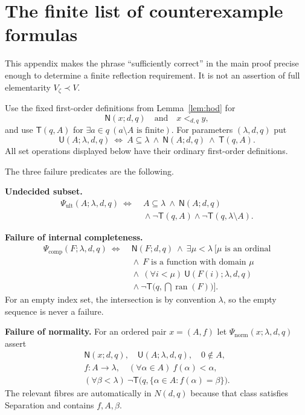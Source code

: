 \documentclass[11pt,letterpaper]{article}
\theoremstyle{definition}
\newcommand{\ran}{\operatorname{ran}}
\begin{document}
\appendix
\section{The finite list of counterexample formulas}\label{app:formulas}

This appendix makes the phrase ``sufficiently correct'' in the main proof precise enough to determine a finite reflection requirement. It is not an assertion of full elementarity $V_\zeta\prec V$.

Use the fixed first-order definitions from Lemma~\ref{lem:hod} for
\[
 \mathsf N(x;d,q)\quad\text{and}\quad x<_{d,q}y,
\]
and use $\mathsf T(q,A)$ for $\exists a\in q\ (a\setminus A\text{ is finite})$. For parameters $(\lambda,d,q)$ put
\[
 \mathsf U(A;\lambda,d,q)\ \Longleftrightarrow\
       A\subseteq\lambda\ \wedge\ \mathsf N(A;d,q)\ \wedge\ \mathsf T(q,A).
\]
All set operations displayed below have their ordinary first-order definitions.

The three failure predicates are the following.

\textbf{Undecided subset.}
\[
 \begin{split}
 \Psi_{\mathrm{ult}}(A;\lambda,d,q)\ \Longleftrightarrow\;&
 A\subseteq\lambda\ \wedge\ \mathsf N(A;d,q)\\
 &{}\wedge\neg\mathsf T(q,A)
       \wedge\neg\mathsf T(q,\lambda\setminus A).
 \end{split}
\]

\textbf{Failure of internal completeness.}
\[
 \begin{split}
 \Psi_{\mathrm{comp}}(F;\lambda,d,q)\ \Longleftrightarrow\;&
 \mathsf N(F;d,q)\ \wedge\
 \exists\mu<\lambda\ \bigl[\mu\text{ is an ordinal}\\
 &{}\wedge\ F\text{ is a function with domain }\mu\\
 &{}\wedge\ (\forall i<\mu)\ \mathsf U(F(i);\lambda,d,q)\\
 &{}\wedge\neg\mathsf T\bigl(q,\bigcap\ran(F)\bigr)\bigr].
 \end{split}
\]
For an empty index set, the intersection is by convention $\lambda$, so the empty sequence is never a failure.

\textbf{Failure of normality.}
For an ordered pair $x=(A,f)$ let $\Psi_{\mathrm{norm}}(x;\lambda,d,q)$ assert
\[
 \begin{gathered}
 \mathsf N(x;d,q),\quad \mathsf U(A;\lambda,d,q),\quad 0\notin A,\\
 f:A\to\lambda,\quad(\forall\alpha\in A)\ f(\alpha)<\alpha,\\
 (\forall\beta<\lambda)\
      \neg\mathsf T\bigl(q,\{\alpha\in A:f(\alpha)=\beta\}\bigr).
 \end{gathered}
\]
The relevant fibres are automatically in $N(d,q)$ because that class satisfies Separation and contains $f,A,\beta$.
\end{document}
